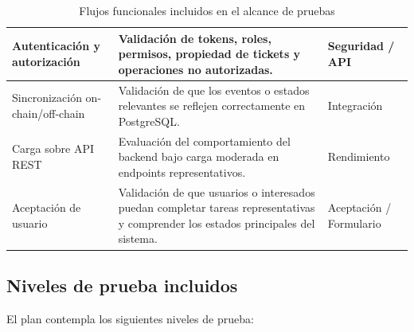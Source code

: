 \documentclass[12pt,letterpaper]{article}
\begin{document}
\begin{table}[H]
\begin{tabularx}{\textwidth}{|
>{\raggedright\arraybackslash}p{3.2cm}|
>{\raggedright\arraybackslash}X|
>{\raggedright\arraybackslash}p{3.4cm}|}
Autenticación y autorización &
Validación de tokens, roles, permisos, propiedad de tickets y operaciones no autorizadas. &
Seguridad / API \\
\hline

Sincronización on-chain/off-chain &
Validación de que los eventos o estados relevantes se reflejen correctamente en PostgreSQL. &
Integración \\
\hline

Carga sobre API REST &
Evaluación del comportamiento del backend bajo carga moderada en endpoints representativos. &
Rendimiento \\
\hline

Aceptación de usuario &
Validación de que usuarios o interesados puedan completar tareas representativas y comprender los estados principales del sistema. &
Aceptación / Formulario \\
\hline

\end{tabularx}

\endgroup

\caption{Flujos funcionales incluidos en el alcance de pruebas}
\label{tab:flujos-funcionales-incluidos}
\end{table}

\subsection{Niveles de prueba incluidos}

El plan contempla los siguientes niveles de prueba:
\end{document}
